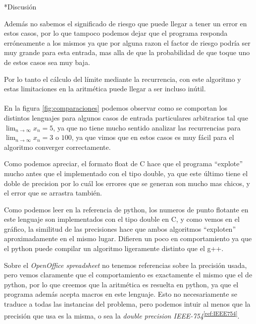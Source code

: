\documentclass[12pt,titlepage]{article}
\newenvironment{usection}[1]{\newpage\begin{section}*{#1}	\addcontentsline{toc}{section}{#1}}{\end{section}}
\newcommand{\superref}[1]{\textsuperscript{\ref{#1}}}
\begin{document}
\begin{usection}{Discusión}
		Además no sabemos el significado de riesgo que puede llegar a tener
		un error en estos casos, por lo que tampoco podemos dejar que
		el programa responda erróneamente a los mismos ya que
		por alguna razon el factor de riesgo podría ser muy grande para esta entrada,
		mas alla de que la probabilidad de que toque uno de estos casos sea muy baja.

		Por lo tanto el cálculo del límite mediante la recurrencia,
		con este algoritmo y estas limitaciones en la aritmética puede llegar a ser incluso inútil. \\
\\
		En la figura \ref{fig:comparaciones} podemos observar como se comportan
		los distintos lenguajes para algunos casos de entrada
		particulares arbitrarios tal que $\lim_{n\to\infty} x_n = 5$,
		ya que no tiene mucho sentido analizar las recurrencias
		para $\lim_{n\to\infty} x_n = 3$ o $100$,
		ya que vimos que en estos casos es muy fácil para el algoritmo
		converger correctamente.

		Como podemos apreciar, el formato float de C hace
		que el programa ``explote'' mucho antes que el implementado
		con el tipo double, ya que este último tiene el doble de precision
		por lo cuál los errores que se generan son mucho mas chicos,
		y el error que se arrastra también.

		Como podemos leer en la referencia de python,
		los numeros de punto flotante en este lenguaje
		son implementados con el tipo double en C, y como vemos en el gráfico,
		la similitud de las precisiones hace que ambos algoritmos
		``exploten'' aproximadamente en el mismo lugar.
		Difieren un poco en comportamiento ya que el python
		puede compilar un algoritmo ligeramente distinto que el g++.

		Sobre el \textit{OpenOffice spreadsheet} no tenemos referencias sobre la precisión usada,
		pero vemos claramente que el comportamiento es exactamente el mismo que el de python,
		por lo que creemos que la aritmética es resuelta en python,
		ya que el programa además acepta macros en este lenguaje.
		Esto no necesariamente se traduce a todas las instancias del problema,
		pero podemos intuir al menos que la precisión que usa es la misma,
		o sea la \textit{double precision IEEE-754}\superref{ref:IEEE754}.


\end{usection}
\end{document}
